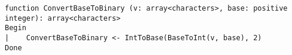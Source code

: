\begin{lstlisting}[breaklines]
function ConvertBaseToBinary (v: array<characters>, base: positive integer): array<characters>
Begin
|    ConvertBaseToBinary <- IntToBase(BaseToInt(v, base), 2)
Done
\end{lstlisting}
